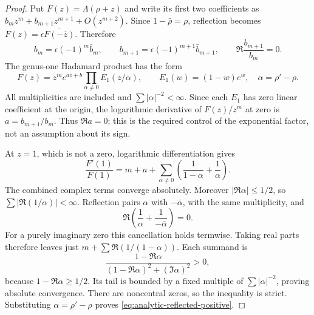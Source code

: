 \begin{proof}
Put $F(z)=\Lambda(\rho+z)$ and write its first two coefficients
as $b_mz^m+b_{m+1}z^{m+1}+O(z^{m+2})$. Since
$1-\bar\rho=\rho$, reflection becomes
$F(z)=\epsilon\overline{F(-\bar z)}$. Therefore
\[
 b_m=\epsilon(-1)^m\bar b_m,
 \qquad b_{m+1}=\epsilon(-1)^{m+1}\bar b_{m+1},
 \qquad
 \Re\frac{b_{m+1}}{b_m}=0.
\]
The genus-one Hadamard product has the form
\[
 F(z)=z^m e^{az+b}\prod_{\alpha\ne0}
           E_1(z/\alpha),\qquad
 E_1(w)=(1-w)e^w,
 \quad \alpha=\rho'-\rho.
\]
All multiplicities are included and
$\sum |\alpha|^{-2}<\infty$. Since each $E_1$ has zero
linear coefficient at the origin, the logarithmic derivative
of $F(z)/z^m$ at zero is $a=b_{m+1}/b_m$. Thus
$\Re a=0$; this is the required control of the exponential
factor, not an assumption about its sign.

At $z=1$, which is not a zero, logarithmic differentiation gives
\[
 \frac{F'(1)}{F(1)}=m+a+
     \sum_{\alpha\ne0}\left(\frac1{1-\alpha}
                                      +\frac1\alpha\right).
\]
The combined complex terms converge absolutely. Moreover
$|\Re\alpha|\le1/2$, so
$\sum|\Re(1/\alpha)|<\infty$. Reflection pairs $\alpha$ with
$-\bar\alpha$, with the same multiplicity, and
\[
 \Re\left(\frac1\alpha+\frac1{-\bar\alpha}\right)=0.
\]
For a purely imaginary zero this cancellation holds termwise.
Taking real parts therefore leaves just
$m+\sum\Re(1/(1-\alpha))$. Each summand is
\[
 \frac{1-\Re\alpha}
 {(1-\Re\alpha)^2+(\Im\alpha)^2}>0,
\]
because $1-\Re\alpha\ge1/2$. Its tail is bounded by a fixed
multiple of $\sum|\alpha|^{-2}$, proving absolute convergence.
There are noncentral zeros, so the inequality is strict.
Substituting $\alpha=\rho'-\rho$ proves
\eqref{eq:analytic-reflected-positive}.
\end{proof}

